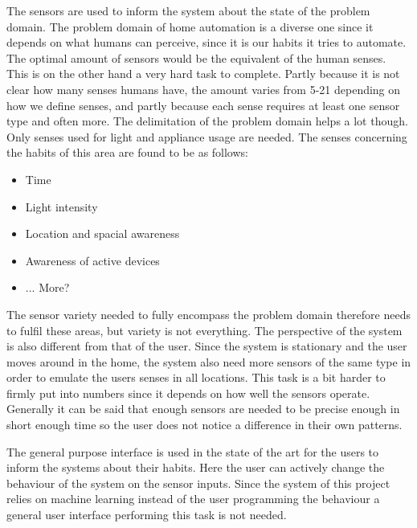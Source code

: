 The sensors are used to inform the system about the state of the problem domain. The problem domain of home automation is a diverse one since it depends on what humans can perceive, since it is our habits it tries to automate. The optimal amount of sensors would be the equivalent of the human senses. This is on the other hand a very hard task to complete. Partly because it is not clear how many senses humans have, the amount varies from 5-21 depending on how we define senses, and partly because each sense requires at least one sensor type and often more. The delimitation of the problem domain helps a lot though. Only senses used for light and appliance usage are needed. The senses concerning the habits of this area are found to be as follows:
\begin{itemize}
	\item Time
	\item Light intensity
	\item Location and spacial awareness
	\item Awareness of active devices
	\item ... More?
\end{itemize}
The sensor variety needed to fully encompass the problem domain therefore needs to fulfil these areas, but variety is not everything. The perspective of the system is also different from that of the user. Since the system is stationary and the user moves around in the home, the system also need more sensors of the same type in order to emulate the users senses in all locations. This task is a bit harder to firmly put into numbers since it depends on how well the sensors operate. Generally it can be said that enough sensors are needed to be precise enough in short enough time so the user does not notice a difference in their own patterns.

The general purpose interface is used in the state of the art for the users to inform the systems about their habits. Here the user can actively change the behaviour of the system on the sensor inputs. Since the system of this project relies on machine learning instead of the user programming the behaviour a general user interface performing this task is not needed.

